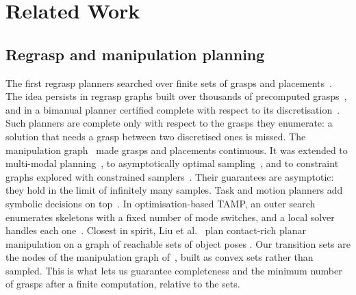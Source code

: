 \section{Related Work}
\label{sec:related}

\subsection{Regrasp and manipulation planning}
The first regrasp planners searched over finite sets of grasps and
placements~\cite{tournassoud1987regrasping,alami1990geometrical}. The
idea persists in regrasp graphs built over thousands of precomputed
grasps~\cite{wan2017regrasp}, and in a bimanual planner certified complete
with respect to its discretisation~\cite{lertkultanon2018certified}.
Such planners are complete only with respect to the grasps they enumerate: a
solution that needs a grasp between two discretised ones is missed. The
manipulation graph~\cite{simeon2004manipulation} made grasps and placements
continuous. It was extended to multi-modal
planning~\cite{hauser2010multimodal}, to asymptotically
optimal sampling~\cite{schmitt2017optimal}, and to
constraint graphs explored with constrained
samplers~\cite{mirabel2016hpp,kingston2018sampling}. Their guarantees are asymptotic: they hold in the
limit of infinitely many samples. Task and motion planners add symbolic decisions on
top~\cite{garrett2021integrated}. In optimisation-based
TAMP, an outer search enumerates skeletons with a fixed number of mode
switches, and a local solver handles each one~\cite{toussaint2015lgp}.
Closest in spirit, Liu et al.~\cite{liu2026graph} plan contact-rich planar
manipulation on a graph of reachable sets of object poses
. Our transition sets are the nodes of the
manipulation graph of~\cite{simeon2004manipulation}, built as convex sets
rather than sampled. This is what lets us guarantee completeness and the
minimum number of grasps after a finite computation, relative to the sets.

